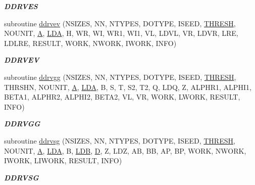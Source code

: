\begin{DoxyCompactItemize}
\begin{DoxyCompactList}\small\item\em {\bfseries D\+D\+R\+V\+E\+S} \end{DoxyCompactList}\item 
subroutine \hyperlink{group__double__eig_ga11aeae4727a8a3236db6a56d3ca220c1}{ddrvev} (N\+S\+I\+Z\+E\+S, N\+N, N\+T\+Y\+P\+E\+S, D\+O\+T\+Y\+P\+E, I\+S\+E\+E\+D, \hyperlink{zlaqgs_8c_a0656018abfc9fa2821827415f5d5ea57}{T\+H\+R\+E\+S\+H}, N\+O\+U\+N\+I\+T, \hyperlink{classA}{A}, \hyperlink{example__user_8c_ae946da542ce0db94dced19b2ecefd1aa}{L\+D\+A}, H, W\+R, W\+I, W\+R1, W\+I1, V\+L, L\+D\+V\+L, V\+R, L\+D\+V\+R, L\+R\+E, L\+D\+L\+R\+E, R\+E\+S\+U\+L\+T, W\+O\+R\+K, N\+W\+O\+R\+K, I\+W\+O\+R\+K, I\+N\+F\+O)
\begin{DoxyCompactList}\small\item\em {\bfseries D\+D\+R\+V\+E\+V} \end{DoxyCompactList}\item 
subroutine \hyperlink{group__double__eig_gaf88edcce9dcbf23eda454e31d1b422db}{ddrvgg} (N\+S\+I\+Z\+E\+S, N\+N, N\+T\+Y\+P\+E\+S, D\+O\+T\+Y\+P\+E, I\+S\+E\+E\+D, \hyperlink{zlaqgs_8c_a0656018abfc9fa2821827415f5d5ea57}{T\+H\+R\+E\+S\+H}, T\+H\+R\+S\+H\+N, N\+O\+U\+N\+I\+T, \hyperlink{classA}{A}, \hyperlink{example__user_8c_ae946da542ce0db94dced19b2ecefd1aa}{L\+D\+A}, B, S, T, S2, T2, Q, L\+D\+Q, Z, A\+L\+P\+H\+R1, A\+L\+P\+H\+I1, B\+E\+T\+A1, A\+L\+P\+H\+R2, A\+L\+P\+H\+I2, B\+E\+T\+A2, V\+L, V\+R, W\+O\+R\+K, L\+W\+O\+R\+K, R\+E\+S\+U\+L\+T, I\+N\+F\+O)
\begin{DoxyCompactList}\small\item\em {\bfseries D\+D\+R\+V\+G\+G} \end{DoxyCompactList}\item 
subroutine \hyperlink{group__double__eig_gac58eaea06da0e219700ba96536201242}{ddrvsg} (N\+S\+I\+Z\+E\+S, N\+N, N\+T\+Y\+P\+E\+S, D\+O\+T\+Y\+P\+E, I\+S\+E\+E\+D, \hyperlink{zlaqgs_8c_a0656018abfc9fa2821827415f5d5ea57}{T\+H\+R\+E\+S\+H}, N\+O\+U\+N\+I\+T, \hyperlink{classA}{A}, \hyperlink{example__user_8c_ae946da542ce0db94dced19b2ecefd1aa}{L\+D\+A}, B, \hyperlink{example__user_8c_a50e90a7104df172b5a89a06c47fcca04}{L\+D\+B}, \hyperlink{odrpack_8h_a7dae6ea403d00f3687f24a874e67d139}{D}, Z, L\+D\+Z, A\+B, B\+B, A\+P, B\+P, W\+O\+R\+K, N\+W\+O\+R\+K, I\+W\+O\+R\+K, L\+I\+W\+O\+R\+K, R\+E\+S\+U\+L\+T, I\+N\+F\+O)
\begin{DoxyCompactList}\small\item\em {\bfseries D\+D\+R\+V\+S\+G} \end{DoxyCompactList}\item 

\end{DoxyCompactItemize}
